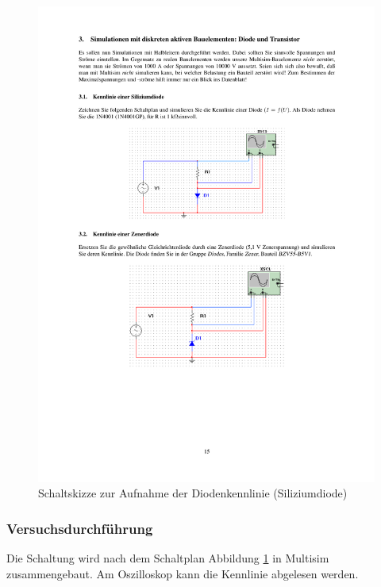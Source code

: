 \documentclass[12pt,a4paper]{article}
\begin{document}
\begin{figure}[H] 
  \centering
    \includegraphics[trim = 10mm 160mm 10mm 75mm, clip, scale = 1]{ep5_14[Page15].pdf}
  	\caption[Schaltskizze zur Aufnahme der Diodenkennlinie (Siliziumdiode)]{Schaltskizze zur Aufnahme der Diodenkennlinie (Siliziumdiode)\footnotemark}
  \label{fig:3.1}
\end{figure}

\subsubsection{Versuchsdurchführung}
Die Schaltung wird nach dem Schaltplan Abbildung \ref{fig:3.1} in Multisim zusammengebaut. Am Oszilloskop kann die Kennlinie abgelesen werden.
\end{document}
